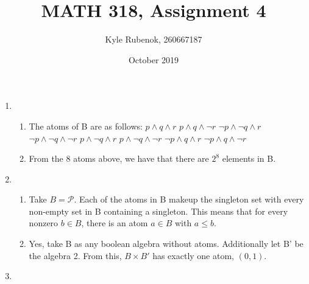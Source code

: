 \documentclass{article}
\title{MATH 318, Assignment 4}
\author{Kyle Rubenok, 260667187}
\date{October 2019}
\begin{document}
\maketitle

    \begin{enumerate}
        \item 
            \begin{enumerate}[label=\arabic*)] 
                \item The atoms of B are as follows: 
                    \newline 
                    $p \wedge q \wedge r$ \tab $p \wedge q \wedge \neg r$ \newline
                    $\neg p \wedge \neg q \wedge r$ \tab $\neg p \wedge \neg q \wedge \neg r$ \newline
                    $p \wedge \neg q \wedge r$ \tab $p \wedge \neg q \wedge \neg r$ \newline
                    $\neg p \wedge q \wedge r$ \tab $\neg p \wedge q \wedge \neg r$ \newline
                \item From the 8 atoms above, we have that there are $2^8$ elements in B. 
            \end{enumerate}
        \item
            \begin{enumerate}[label=\arabic*)]
                \item Take $B = \mathcal{P}$. Each of the atoms in B makeup the singleton set with every non-empty set in B containing a singleton. This means that for every nonzero $b \in B$, there is an atom $a \in B$ with $ a \leq b$. 
                \item Yes, take B as any boolean algebra without atoms. Additionally let B' be the algebra 2. From this, $B \times B'$ has exactly one atom, $(0,1)$.
            \end{enumerate}
        \item 
    \end{enumerate}
\end{document}
